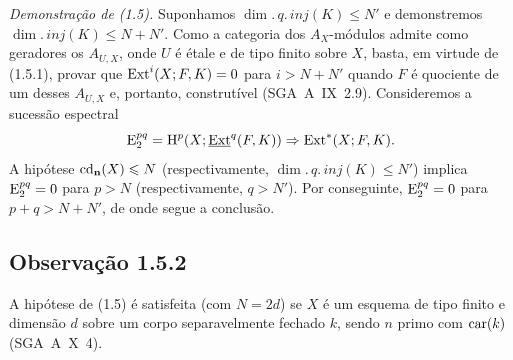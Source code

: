 \emph{Demonstração de (1.5).} Suponhamos $\dim.\,q.\,inj(K) \leqslant N'$ e demonstremos $\dim.\,inj(K) \leqslant N + N'$. Como a categoria dos $A_X$-módulos admite como geradores os $A_{U,X}$, onde $U$ é étale e de tipo finito sobre $X$, basta, em virtude de (1.5.1), provar que $\operatorname{Ext}^i(X; F,K) = 0$ para $i > N + N'$ quando $F$ é quociente de um desses $A_{U,X}$ e, portanto, construtível (SGA~A~IX~2.9). Consideremos a sucessão espectral
\[
\mathrm{E}_2^{pq} = \mathrm{H}^p(X; \underline{\operatorname{Ext}}^q(F,K)) \Rightarrow \operatorname{Ext}^{*}(X; F,K).
\]
A hipótese $\operatorname{cd}_{\mathbf{n}}(X) \leqslant N$ (respectivamente, $\dim.\,q.\,inj(K) \leqslant N'$) implica $\mathrm{E}_2^{pq} = 0$ para $p > N$ (respectivamente, $q > N'$). Por conseguinte, $\mathrm{E}_2^{pq} = 0$ para $p+q > N+N'$, de onde segue a conclusão.

\subsection*{Observação 1.5.2}
A hipótese de (1.5) é satisfeita (com $N = 2d$) se $X$ é um esquema de tipo finito e dimensão $d$ sobre um corpo separavelmente fechado $k$, sendo $n$ primo com $\operatorname{car}(k)$ (SGA~A~X~4).
